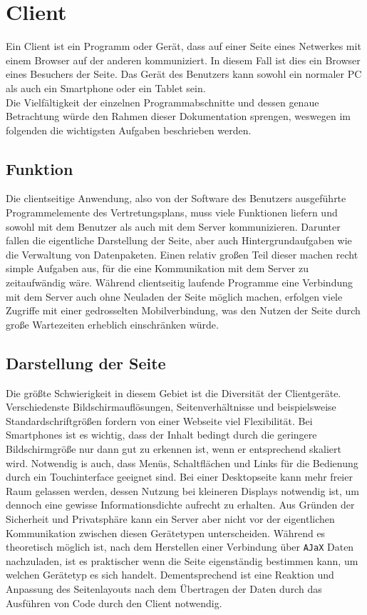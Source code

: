 \section{Client}
Ein Client ist ein Programm oder Gerät, dass auf einer Seite eines Netwerkes mit einem Browser auf der anderen kommuniziert. In diesem Fall ist dies ein Browser eines Besuchers der Seite. Das Gerät des Benutzers kann sowohl ein normaler PC als auch ein Smartphone oder ein Tablet sein.\\
Die Vielfältigkeit der einzelnen Programmabschnitte und dessen genaue Betrachtung würde den Rahmen dieser Dokumentation sprengen, weswegen im folgenden die wichtigsten Aufgaben beschrieben werden. 
\subsection{Funktion}
Die clientseitige Anwendung, also von der Software des Benutzers ausgeführte Programmelemente des Vertretungsplans, muss viele Funktionen liefern und sowohl mit dem Benutzer als auch mit dem Server kommunizieren. Darunter fallen die eigentliche Darstellung der Seite, aber auch Hintergrundaufgaben wie die Verwaltung von Datenpaketen. Einen relativ großen Teil dieser machen recht simple Aufgaben aus, für die eine Kommunikation mit dem Server zu zeitaufwändig wäre. Während clientseitig laufende Programme eine Verbindung mit dem Server auch ohne Neuladen der Seite möglich machen, erfolgen viele Zugriffe mit einer gedrosselten Mobilverbindung, was den Nutzen der Seite durch große Wartezeiten erheblich einschränken würde.

\subsection{Darstellung der Seite}
Die größte Schwierigkeit in diesem Gebiet ist die Diversität der Clientgeräte. Verschiedenste Bildschirmauflösungen, Seitenverhältnisse und beispielsweise Standardschriftgrößen fordern von einer Webseite viel Flexibilität. Bei Smartphones ist es wichtig, dass der Inhalt bedingt durch die geringere Bildschirmgröße nur dann gut zu erkennen ist, wenn er entsprechend skaliert wird. Notwendig is auch, dass Menüs, Schaltflächen und Links für die Bedienung durch ein Touchinterface geeignet sind. Bei einer Desktopseite kann mehr freier Raum gelassen werden, dessen Nutzung bei kleineren Displays notwendig ist, um dennoch eine gewisse Informationsdichte aufrecht zu erhalten. Aus Gründen der Sicherheit und Privatsphäre kann ein Server aber nicht vor der eigentlichen Kommunikation zwischen diesen Gerätetypen unterscheiden. Während es theoretisch möglich ist, nach dem Herstellen einer Verbindung über \texttt{AJaX} Daten nachzuladen, ist es praktischer wenn die Seite eigenständig bestimmen kann, um welchen Gerätetyp es sich handelt. Dementsprechend ist eine Reaktion und Anpassung des Seitenlayouts nach dem Übertragen der Daten durch das Ausführen von Code durch den Client notwendig.

